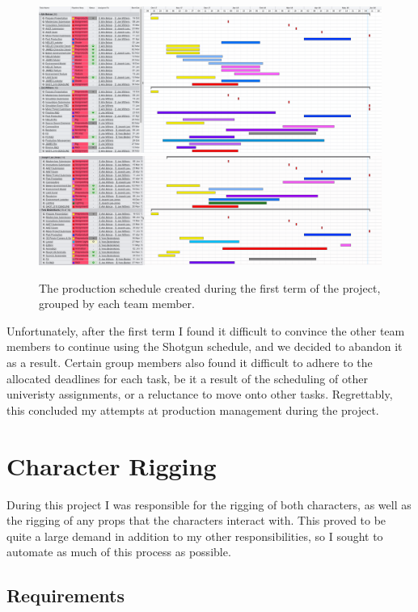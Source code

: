 \documentclass[11pt]{article}
\begin{document}
\begin{figure}[htbp]
\centering
\includegraphics[width=1.0\linewidth]{images/schedule01.png}
\includegraphics[width=1.0\linewidth]{images/schedule02.png}
\caption{\label{figure:schedule} The production schedule created during the first term of the project, grouped by each team member.}
\end{figure}

Unfortunately, after the first term I found it difficult to convince the other team members to continue using the Shotgun schedule, and we decided to abandon it as a result. Certain group members also found it difficult to adhere to the allocated deadlines for each task, be it a result of the scheduling of other univeristy assignments, or a reluctance to move onto other tasks. Regrettably, this concluded my attempts at production management during the project.

\section{Character Rigging}

During this project I was responsible for the rigging of both characters, as well as the rigging of any props that the characters interact with. This proved to be quite a large demand in addition to my other responsibilities, so I sought to automate as much of this process as possible.

\subsection{Requirements}
\end{document}
